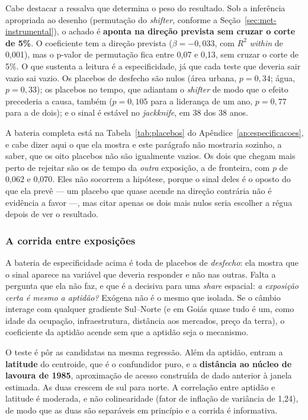 Cabe destacar a ressalva que determina o peso do resultado. Sob a inferência
apropriada ao desenho (permutação do \emph{shifter}, conforme a Seção~\ref{sec:met-instrumental}), o achado é
\textbf{aponta na direção prevista sem cruzar o corte de 5\%}. O coeficiente tem a direção prevista ($\beta = -0{,}033$, com $R^2$ \emph{within}
de 0,001), mas o p-valor de permutação fica entre 0,07 e 0,13, sem cruzar o corte de
5\%. O que sustenta a leitura é a especificidade, já que cada teste que deveria sair
vazio sai vazio. Os placebos de desfecho são nulos (área urbana, $p = 0{,}34$;
água, $p = 0{,}33$); os placebos no tempo, que adiantam o \emph{shifter} de modo
que o efeito precederia a causa, também ($p = 0{,}105$ para a liderança de um
ano, $p = 0{,}77$ para a de dois); e o sinal é estável no \emph{jackknife}, em
38 dos 38 anos.

A bateria completa está na Tabela~\ref{tab:placebos} do
Apêndice~\ref{ap:especificacoes}, e cabe dizer aqui o que ela mostra e este
parágrafo não mostraria sozinho, a saber, que os oito placebos não são igualmente vazios. Os
dois que chegam mais perto de rejeitar são os de tempo da \emph{outra}
exposição, a de fronteira, com $p$ de 0,062 e 0,070. Eles não socorrem a
hipótese, porque o sinal deles é o oposto do que ela prevê --- um placebo que
quase acende na direção contrária não é evidência a favor ---, mas citar apenas
os dois mais nulos seria escolher a régua depois de ver o resultado.

\subsubsection*{A corrida entre exposições}

A bateria de especificidade acima é toda de placebos de \emph{desfecho}: ela
mostra que o sinal aparece na variável que deveria responder e não nas outras.
Falta a pergunta que ela não faz, e que é a decisiva para uma \emph{share}
espacial: \emph{a exposição certa é mesmo a aptidão?} Exógena não é o mesmo que
isolada. Se o câmbio interage com qualquer gradiente Sul--Norte (e em Goiás
quase tudo é um, como idade da ocupação, infraestrutura, distância aos mercados,
preço da terra), o coeficiente da aptidão acende sem que a aptidão seja o
mecanismo.

O teste é pôr as candidatas na mesma regressão. Além da aptidão, entram a
\textbf{latitude} do centroide, que é o confundidor puro, e a \textbf{distância
ao núcleo de lavoura de 1985}, aproximação de acesso construída de dado
anterior à janela estimada. As duas crescem de sul para norte. A correlação
entre aptidão e latitude é moderada, e não colinearidade (fator de inflação de
variância de 1,24), de modo que as duas são separáveis em princípio e a corrida é
informativa.

